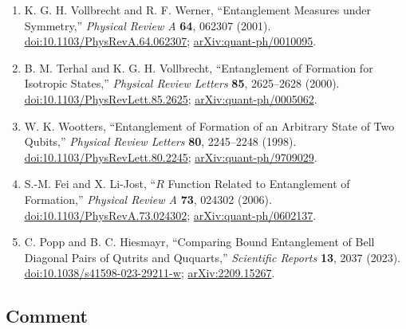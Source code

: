 \begin{enumerate}[label={},leftmargin=4.8em,labelsep=0.5em]
  \footnotesize
  \item[\textup{[VW01]}]\label{ref:p56-vollbrecht-werner}
  K. G. H. Vollbrecht and R. F. Werner,
  ``Entanglement Measures under Symmetry,''
  \emph{Physical Review A} \textbf{64}, 062307 (2001).
  \href{https://doi.org/10.1103/PhysRevA.64.062307}{doi:10.1103/PhysRevA.64.062307};
  \href{https://arxiv.org/abs/quant-ph/0010095}{arXiv:quant-ph/0010095}.

  \item[\textup{[TV00]}]\label{ref:p56-terhal-vollbrecht}
  B. M. Terhal and K. G. H. Vollbrecht,
  ``Entanglement of Formation for Isotropic States,''
  \emph{Physical Review Letters} \textbf{85}, 2625--2628 (2000).
  \href{https://doi.org/10.1103/PhysRevLett.85.2625}{doi:10.1103/PhysRevLett.85.2625};
  \href{https://arxiv.org/abs/quant-ph/0005062}{arXiv:quant-ph/0005062}.

  \item[\textup{[Woo98]}]\label{ref:p56-wootters}
  W. K. Wootters,
  ``Entanglement of Formation of an Arbitrary State of Two Qubits,''
  \emph{Physical Review Letters} \textbf{80}, 2245--2248 (1998).
  \href{https://doi.org/10.1103/PhysRevLett.80.2245}{doi:10.1103/PhysRevLett.80.2245};
  \href{https://arxiv.org/abs/quant-ph/9709029}{arXiv:quant-ph/9709029}.

  \item[\textup{[FLJ06]}]\label{ref:p56-fei-li-jost}
  S.-M. Fei and X. Li-Jost,
  ``$R$ Function Related to Entanglement of Formation,''
  \emph{Physical Review A} \textbf{73}, 024302 (2006).
  \href{https://doi.org/10.1103/PhysRevA.73.024302}{doi:10.1103/PhysRevA.73.024302};
  \href{https://arxiv.org/abs/quant-ph/0602137}{arXiv:quant-ph/0602137}.

  \item[\textup{[PH23]}]\label{ref:p56-popp-hiesmayr}
  C. Popp and B. C. Hiesmayr,
  ``Comparing Bound Entanglement of Bell Diagonal Pairs of Qutrits and
  Ququarts,'' \emph{Scientific Reports} \textbf{13}, 2037 (2023).
  \href{https://doi.org/10.1038/s41598-023-29211-w}{doi:10.1038/s41598-023-29211-w};
  \href{https://arxiv.org/abs/2209.15267}{arXiv:2209.15267}.
\end{enumerate}

\subsection*{Comment}

